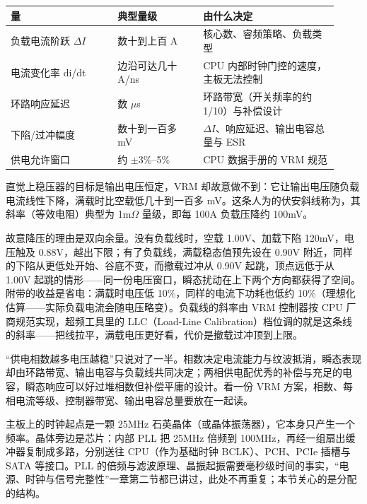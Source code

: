 \begin{longtable}{L{0.30\linewidth}L{0.24\linewidth}L{0.38\linewidth}}
\toprule
量 & 典型量级 & 由什么决定 \\
\midrule
负载电流阶跃 $\Delta I$ & 数十到上百 A & 核心数、睿频策略、负载类型 \\\tablerowrule
电流变化率 di/dt & 边沿可达几十 A/ns & CPU 内部时钟门控的速度，主板无法控制 \\\tablerowrule
环路响应延迟 & 数 $\mu$s & 环路带宽（开关频率的约 1/10）与补偿设计 \\\tablerowrule
下陷/过冲幅度 & 数十到一百多 mV & $\Delta I$、响应延迟、输出电容总量与 ESR \\\tablerowrule
供电允许窗口 & 约 $\pm$3\%--5\% & CPU 数据手册的 VRM 规范 \\
\bottomrule
\end{longtable}


直觉上稳压器的目标是输出电压恒定，VRM 却故意做不到：它让输出电压随负载电流线性下降，满载时比空载低几十到一百多 mV。这条人为的伏安斜线称为，其斜率（等效电阻）典型为 1m$\Omega$ 量级，即每 100A 负载压降约 100mV。

故意降压的理由是双向余量。没有负载线时，空载 1.00V、加载下陷 120mV，电压触及 0.88V，越出下限；有了负载线，满载稳态值预先设在 0.90V 附近，同样的下陷从更低处开始、谷底不变，而撤载过冲从 0.90V 起跳，顶点远低于从 1.00V 起跳的情形——同一份电压窗口，瞬态扰动在上下两个方向都获得了空间。附带的收益是省电：满载时电压低 10\%，同样的电流下功耗也低约 10\%（理想化估算——实际负载电流会随电压略变）。负载线的斜率由 VRM 控制器按 CPU 厂商规范实现，超频工具里的 LLC（Load-Line Calibration）档位调的就是这条线的斜率——把线拉平，满载电压更好看，代价是撤载过冲顶到上限。

\begin{warningbox}
“供电相数越多电压越稳”只说对了一半。相数决定电流能力与纹波抵消，瞬态表现却由环路带宽、输出电容与负载线共同决定；两相供电配优秀的补偿与充足的电容，瞬态响应可以好过堆相数但补偿平庸的设计。看一份 VRM 方案，相数、每相电流等级、控制器带宽、输出电容总量要放在一起读。
\end{warningbox}


主板上的时钟起点是一颗 25MHz 石英晶体（或晶体振荡器），它本身只产生一个频率。晶体旁边是芯片：内部 PLL 把 25MHz 倍频到 100MHz，再经一组扇出缓冲器复制成多路，分别送往 CPU（作为基础时钟 BCLK）、PCH、PCIe 插槽与 SATA 等接口。PLL 的倍频与滤波原理、晶振起振需要毫秒级时间的事实，“电源、时钟与信号完整性”一章第二节都已讲过，此处不再重复；本节关心的是分配的结构。


